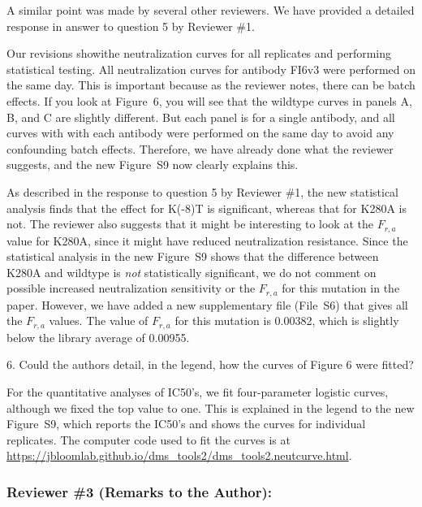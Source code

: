 \documentclass[11pt, oneside]{article}   	%
\begin{document}
{\color{black}
A similar point was made by several other reviewers.
We have provided a detailed response in answer to question 5 by Reviewer \#1.

Our revisions showithe neutralization curves for all replicates and performing statistical testing.
All neutralization curves for antibody FI6v3 were performed on the same day.
This is important because as the reviewer notes, there can be batch effects.
If you look at Figure~6, you will see that the wildtype curves in panels A, B, and C are slightly different.
But each panel is for a single antibody, and all curves with with each antibody were performed on the same day to avoid any confounding batch effects.
Therefore, we have already done what the reviewer suggests, and the new Figure~S9 now clearly explains this.

As described in the response to question 5 by Reviewer \#1, the new statistical analysis finds that the effect for K(-8)T is significant, whereas that for K280A is not.
The reviewer also suggests that it might be interesting to look at the $F_{r,a}$ value for K280A, since it might have reduced neutralization resistance.
Since the statistical analysis in the new Figure~S9 shows that the difference between K280A and wildtype is \emph{not} statistically significant, we do not comment on possible increased neutralization sensitivity or the $F_{r,a}$ for this mutation in the paper.
However, we have added a new supplementary file (File~S6) that gives all the $F_{r,a}$ values.
The value of $F_{r,a}$ for this mutation is 0.00382, which is slightly below the library average of 0.00955.
}

6. Could the authors detail, in the legend, how the curves of Figure 6 were fitted?

{\color{black}
For the quantitative analyses of IC50's, we fit four-parameter logistic curves, although we fixed the top value to one.
This is explained in the legend to the new Figure~S9, which reports the IC50's and shows the curves for individual replicates.
The computer code used to fit the curves is at \url{https://jbloomlab.github.io/dms_tools2/dms_tools2.neutcurve.html}.
}

\subsubsection*{Reviewer \#3 (Remarks to the Author):}
\end{document}
